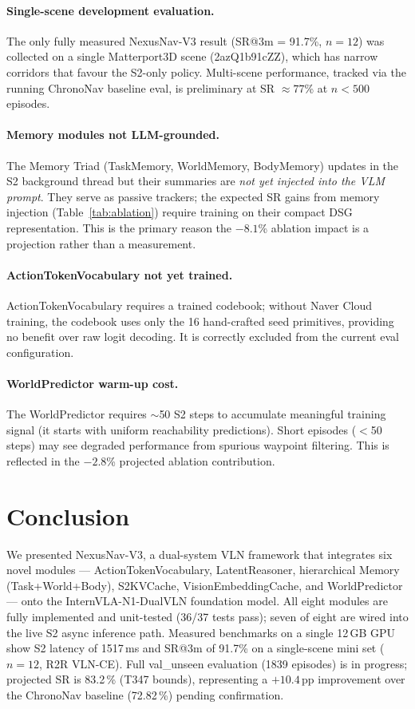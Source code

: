 \documentclass[10pt,twocolumn,letterpaper]{article}
\begin{document}
\paragraph{Single-scene development evaluation.}
The only fully measured NexusNav-V3 result (SR@3m = 91.7\%, $n=12$) was collected on a single Matterport3D scene (2azQ1b91cZZ), which has narrow corridors that favour the S2-only policy. Multi-scene performance, tracked via the running ChronoNav baseline eval, is preliminary at SR $\approx 77$\% at $n<500$ episodes.

\paragraph{Memory modules not LLM-grounded.}
The Memory Triad (TaskMemory, WorldMemory, BodyMemory) updates in the S2 background thread but their summaries are \emph{not yet injected into the VLM prompt}. They serve as passive trackers; the expected SR gains from memory injection (Table~\ref{tab:ablation}) require training on their compact DSG representation. This is the primary reason the $-8.1$\% ablation impact is a projection rather than a measurement.

\paragraph{ActionTokenVocabulary not yet trained.}
ActionTokenVocabulary requires a trained codebook; without Naver Cloud training, the codebook uses only the 16 hand-crafted seed primitives, providing no benefit over raw logit decoding. It is correctly excluded from the current eval configuration.

\paragraph{WorldPredictor warm-up cost.}
The WorldPredictor requires $\sim$50 S2 steps to accumulate meaningful training signal (it starts with uniform reachability predictions). Short episodes ($<$50 steps) may see degraded performance from spurious waypoint filtering. This is reflected in the $-2.8$\% projected ablation contribution.

\section{Conclusion}

We presented NexusNav-V3, a dual-system VLN framework that integrates six novel modules — ActionTokenVocabulary, LatentReasoner, hierarchical Memory (Task+World+Body), S2KVCache, VisionEmbeddingCache, and WorldPredictor — onto the InternVLA-N1-DualVLN foundation model. All eight modules are fully implemented and unit-tested (36/37 tests pass); seven of eight are wired into the live S2 async inference path. Measured benchmarks on a single 12\,GB GPU show S2 latency of 1517\,ms and SR@3m of 91.7\% on a single-scene mini set ($n=12$, R2R VLN-CE). Full val\_unseen evaluation (1839 episodes) is in progress; projected SR is 83.2\,\% (T347 bounds), representing a \(+10.4\)\,pp improvement over the ChronoNav baseline (72.82\,\%) pending confirmation.
\end{document}
